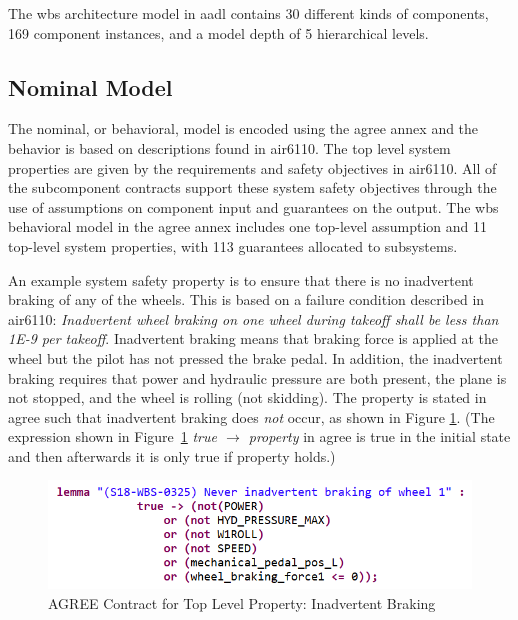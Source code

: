 The \gls{wbs} architecture model in \gls{aadl} contains 30 different kinds of components, 169 component instances, and a model depth of 5 hierarchical levels. 

\subsection{Nominal Model} 
The nominal, or behavioral, model is encoded using the \gls{agree} annex and the behavior is based on descriptions found in \gls{air}6110. The top level system properties are given by the requirements and safety objectives in \gls{air}6110. All of the subcomponent contracts support these system safety objectives through the use of assumptions on component input and guarantees on the output. The \gls{wbs} behavioral model in the \gls{agree} annex includes one top-level assumption and  11 top-level system properties, with 113 guarantees allocated to subsystems.  

An example system safety property is to ensure that there is no inadvertent braking of any of the wheels. This is based on a failure condition described in \gls{air}6110: \textit{Inadvertent wheel braking on one wheel during takeoff shall be less than 1E-9 per takeoff}. 
Inadvertent braking means that braking force is applied at the wheel but the pilot has not pressed the brake pedal.  In addition, the inadvertent braking requires that power and hydraulic pressure are both present, the plane is not stopped, and the wheel is rolling (not skidding). The property is stated in \gls{agree} such that inadvertent braking does \textit{not} occur, as shown in Figure \ref{fig:inadvertent_braking}. (The expression shown in Figure~\ref{fig:inadvertent_braking} \textit{true $\rightarrow$ property} in \gls{agree} is true in the initial state and then afterwards it is only true if property holds.)

\begin{figure}[h!]
	\begin{center}
		\includegraphics[width=.7\textwidth]{images/inadvertent_braking.png}
	\end{center}
	\vspace{-0.3in}
	\caption{AGREE Contract for Top Level Property: Inadvertent Braking}
	\label{fig:inadvertent_braking}
\end{figure}

